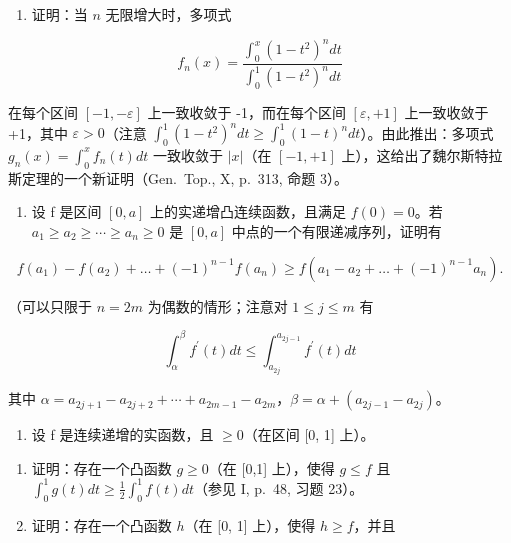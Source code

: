 \begin{enumerate}
\def\labelenumi{\arabic{enumi})}
\setcounter{enumi}{19}
\tightlist
\item
  证明：当 \(n\) 无限增大时，多项式
\end{enumerate}

\[
f _ {n} (x) = \frac {\int_ {0} ^ {x} (1 - t ^ {2}) ^ {n} d t}{\int_ {0} ^ {1} (1 - t ^ {2}) ^ {n} d t}
\]

在每个区间 \([-1, -\varepsilon]\) 上一致收敛于 -1，而在每个区间 \([\varepsilon, +1]\) 上一致收敛于 +1，其中 \(\varepsilon > 0\)（注意 \(\int_{0}^{1}(1-t^{2})^{n}dt \geqslant \int_{0}^{1}(1-t)^{n}dt\)）。由此推出：多项式 \(g_{n}(x) = \int_{0}^{x} f_{n}(t)dt\) 一致收敛于 \(|x|\)（在 \([-1, +1]\) 上），这给出了魏尔斯特拉斯定理的一个新证明（Gen.~Top., X, p.~313, 命题 3）。

\begin{enumerate}
\def\labelenumi{\arabic{enumi})}
\setcounter{enumi}{20}
\tightlist
\item
  设 f 是区间 \([0, a]\) 上的实递增凸连续函数，且满足 \(f(0) = 0\)。若 \(a_{1} \geqslant a_{2} \geqslant \cdots \geqslant a_{n} \geqslant 0\) 是 \([0, a]\) 中点的一个有限递减序列，证明有
\end{enumerate}

\[
f \left(a _ {1}\right) - f \left(a _ {2}\right) + \dots + (- 1) ^ {n - 1} f \left(a _ {n}\right) \geqslant f \left(a _ {1} - a _ {2} + \dots + (- 1) ^ {n - 1} a _ {n}\right).
\]

（可以只限于 \(n = 2m\) 为偶数的情形；注意对 \(1 \leqslant j \leqslant m\) 有

\[
\int_ {\alpha} ^ {\beta} f ^ {\prime} (t) d t \leqslant \int_ {a _ {2 j}} ^ {a _ {2 j - 1}} f ^ {\prime} (t) d t
\]

其中 \(\alpha = a_{2j+1} - a_{2j+2} + \cdots + a_{2m-1} - a_{2m}\)，\(\beta = \alpha + (a_{2j-1} - a_{2j})\)。

\begin{enumerate}
\def\labelenumi{\arabic{enumi})}
\setcounter{enumi}{21}
\tightlist
\item
  设 f 是连续递增的实函数，且 \(\geqslant 0\)（在区间 {[}0, 1{]} 上）。
\end{enumerate}

\begin{enumerate}
\def\labelenumi{\alph{enumi})}
\item
  证明：存在一个凸函数 \(g \geqslant 0\)（在 {[}0,1{]} 上），使得 \(g \leqslant f\) 且 \(\int_0^1 g(t)dt \geqslant \frac{1}{2}\int_0^1 f(t)dt\)（参见 I, p.~48, 习题 23）。
\item
  证明：存在一个凸函数 \(h\)（在 {[}0, 1{]} 上），使得 \(h \geqslant f\)，并且
\end{enumerate}

